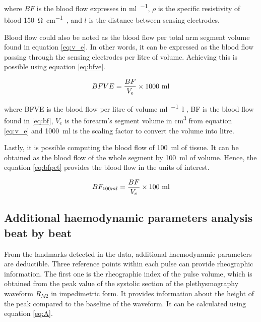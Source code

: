 where $BF$ is the blood flow expresses in \si{\milli\litre\per\min}, $\rho$ is the specific resistivity of blood \SI{150}{\ohm\per\cm}~\cite{mohapatra1981non, nyober1950electrical}, and $l$ is the distance between sensing electrodes.

Blood flow could also be noted as the blood flow per total arm segment volume found in equation \ref{eq:v_e}.  In other words, it can be expressed as the blood flow passing through the sensing electrodes per litre of volume. Achieving this is possible using equation \ref{eq:bfve}.

\begin{align}
	\label{eq:bfve}
	BFVE = \frac{BF}{V_e} \times \text{1000 ml} \tagaddtext{[\si{\ml / \min.\litre}]}
\end{align}

where BFVE is the blood flow per litre of volume \si{\milli\litre\per\min.\litre} , BF is the blood flow found in \ref{eq:bf}, $V_e$ is the forearm's segment volume in \si{\cubic\centi\meter} from equation \ref{eq:v_e} and \SI{1000}{ml} is the scaling factor to convert the volume into litre.

Lastly, it is possible computing the blood flow of \SI{100}{\milli\litre} of tissue.  It can be obtained as the blood flow of the whole segment by \SI{100}{\milli\litre} of volume. Hence, the equation \ref{eq:bfpct} provides the blood flow in the units of interest. 

\begin{align}
	\label{eq:bfpct}
	BF_{100ml} = \frac{BF}{V_e} \times \text{100 ml} \tagaddtext{[\si{ml/min.100.ml}]}
\end{align}

\subsection{Additional haemodynamic parameters analysis beat by beat}
\label{section4.3.3}
From the landmarks detected in the data, additional haemodynamic parameters are deductible. Three reference points within each pulse can provide rheographic information. The first one is the rheographic index of the pulse volume, which is obtained from the peak value of the systolic section of the plethysmography waveform $R_{M2}$ in impedimetric form. It provides information about the height of the peak compared to the baseline of the waveform. It can be calculated using equation \ref{eq:A}.

